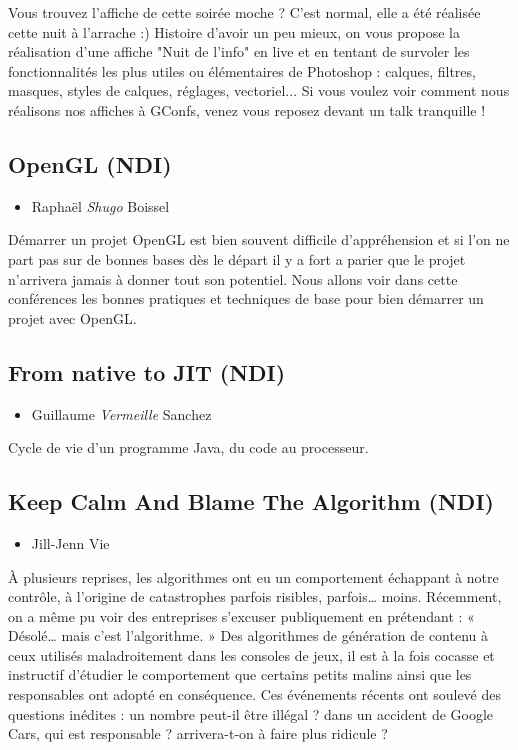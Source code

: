 \documentclass[a4paper]{article}
\begin{document}
Vous trouvez l'affiche de cette soirée moche ? C'est normal, elle a été
réalisée cette nuit à l'arrache :) Histoire d'avoir un peu mieux, on vous
propose la réalisation d'une affiche "Nuit de l'info" en live et en tentant de
survoler les fonctionnalités les plus utiles ou élémentaires de Photoshop :
calques, filtres, masques, styles de calques, réglages, vectoriel... Si vous
voulez voir comment nous réalisons nos affiches à GConfs, venez vous reposez
devant un talk tranquille !

\vspace{0.3cm}

\subsection{OpenGL (NDI)}
\begin{itemize}
    \item Raphaël \emph{Shugo} Boissel
\end{itemize}

Démarrer un projet OpenGL est bien souvent difficile d'appréhension et si l'on
ne part pas sur de bonnes bases dès le départ il y a fort a parier que le
projet n'arrivera jamais à donner tout son potentiel.  Nous allons voir dans
cette conférences les bonnes pratiques et techniques de base pour bien démarrer
un projet avec OpenGL.

\vspace{0.3cm}

\subsection{From native to JIT (NDI)}
\begin{itemize}
    \item Guillaume \emph{Vermeille} Sanchez
\end{itemize}

Cycle de vie d'un programme Java, du code au processeur.

\vspace{0.3cm}

\subsection{Keep Calm And Blame The Algorithm (NDI)}
\begin{itemize}
    \item Jill-Jenn Vie
\end{itemize}

À plusieurs reprises, les algorithmes ont eu un comportement échappant à notre
contrôle, à l'origine de catastrophes parfois risibles, parfois… moins.
Récemment, on a même pu voir des entreprises s'excuser publiquement en
prétendant : « Désolé… mais c'est l'algorithme. » Des algorithmes de génération
de contenu à ceux utilisés maladroitement dans les consoles de jeux, il est à
la fois cocasse et instructif d'étudier le comportement que certains petits
malins ainsi que les responsables ont adopté en conséquence. Ces événements
récents ont soulevé des questions inédites : un nombre peut-il être illégal ?
dans un accident de Google Cars, qui est responsable ? arrivera-t-on à faire
plus ridicule ?
\end{document}

